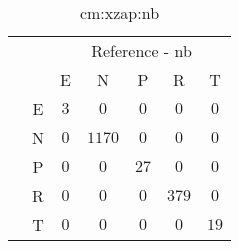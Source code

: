 \begin{table}[!ht]
	\centering
	\begin{tabular}{|c|c|c|c|c|c|c|}
		\cline{3-7}
		\multicolumn{2}{c|}{} & \multicolumn{5}{|c|}{Reference - nb} \\ \cline{3-7}
		\multicolumn{2}{c|}{} & E & N & P & R & T \\ \hline
		\multirow{5}{*}{\rotatebox{90}{Prediction}} & E & $3$ & $0$ & $0$ & $0$ & $0$ \\ \cline{2-7}
		 & N & $0$ & $1170$ & $0$ & $0$ & $0$ \\ \cline{2-7}
		 & P & $0$ & $0$ & $27$ & $0$ & $0$ \\ \cline{2-7}
		 & R & $0$ & $0$ & $0$ & $379$ & $0$ \\ \cline{2-7}
		 & T & $0$ & $0$ & $0$ & $0$ & $19$ \\ \hline
	\end{tabular}
	\caption{cm:xzap:nb}
	\label{tab:cm:xzap:nb}
\end{table}
